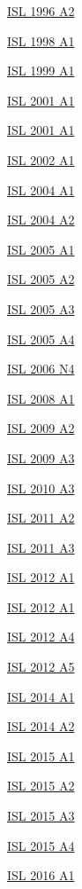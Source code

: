 \hyperref  [problem:ISL 1996 A2]{ISL 1996 A2}

\hyperref  [problem:ISL 1998 A1]{ISL 1998 A1}

\hyperref  [problem:ISL 1999 A1]{ISL 1999 A1}

\hyperref  [problem:ISL 2001 A1]{ISL 2001 A1}

\hyperref  [problem:ISL 2001 A1]{ISL 2001 A1}

\hyperref  [problem:ISL 2002 A1]{ISL 2002 A1}

\hyperref  [problem:ISL 2004 A1]{ISL 2004 A1}

\hyperref  [problem:ISL 2004 A2]{ISL 2004 A2}

\hyperref  [problem:ISL 2005 A1]{ISL 2005 A1}

\hyperref  [problem:ISL 2005 A2]{ISL 2005 A2}

\hyperref  [problem:ISL 2005 A3]{ISL 2005 A3}

\hyperref  [problem:ISL 2005 A4]{ISL 2005 A4}

\hyperref  [problem:ISL 2006 N4]{ISL 2006 N4}

\hyperref  [problem:ISL 2008 A1]{ISL 2008 A1}

\hyperref  [problem:ISL 2009 A2]{ISL 2009 A2}

\hyperref  [problem:ISL 2009 A3]{ISL 2009 A3}

\hyperref  [problem:ISL 2010 A3]{ISL 2010 A3}

\hyperref  [problem:ISL 2011 A2]{ISL 2011 A2}

\hyperref  [problem:ISL 2011 A3]{ISL 2011 A3}

\hyperref  [problem:ISL 2012 A1]{ISL 2012 A1}

\hyperref  [problem:ISL 2012 A1]{ISL 2012 A1}

\hyperref  [problem:ISL 2012 A4]{ISL 2012 A4}

\hyperref  [problem:ISL 2012 A5]{ISL 2012 A5}

\hyperref  [problem:ISL 2014 A1]{ISL 2014 A1}

\hyperref  [problem:ISL 2014 A2]{ISL 2014 A2}

\hyperref  [problem:ISL 2015 A1]{ISL 2015 A1}

\hyperref  [problem:ISL 2015 A2]{ISL 2015 A2}

\hyperref  [problem:ISL 2015 A3]{ISL 2015 A3}

\hyperref  [problem:ISL 2015 A4]{ISL 2015 A4}

\hyperref  [problem:ISL 2016 A1]{ISL 2016 A1}

